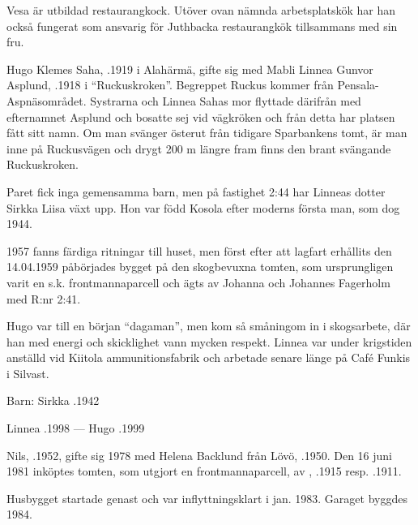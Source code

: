 Vesa är utbildad restaurangkock. Utöver ovan nämnda arbetsplatskök har han också fungerat som ansvarig för Juthbacka restaurangkök tillsammans med sin fru.


%
Hugo Klemes Saha, .1919 i Alahärmä, gifte sig med Mabli Linnea Gunvor Asplund, .1918 i ``Ruckuskroken''. Begreppet Ruckus kommer från Pensala-Aspnäsområdet. Systrarna  och Linnea Sahas mor flyttade därifrån med efternamnet Asplund och bosatte sej vid vägkröken och från detta har platsen fått sitt namn. Om man svänger österut från tidigare Sparbankens tomt, är man inne på Ruckusvägen och drygt 200 m längre fram finns den brant svängande Ruckuskroken.

Paret fick inga gemensamma barn, men på fastighet 2:44 har Linneas dotter Sirkka Liisa växt upp. Hon var född Kosola efter moderns första man, som dog 1944.

1957 fanns färdiga ritningar till huset, men först efter att lagfart erhållits den 14.04.1959 påbörjades bygget på den skogbevuxna tomten, som ursprungligen varit en s.k. frontmannaparcell och ägts av Johanna och Johannes Fagerholm med R:nr 2:41.

Hugo var till en början ``dagaman'', men kom så småningom in i skogsarbete, där han med energi och skicklighet vann mycken respekt. Linnea var under krigstiden anställd vid Kiitola ammunitionsfabrik och arbetade senare länge på Café Funkis i Silvast.

Barn: Sirkka  .1942

Linnea .1998  ---  Hugo .1999



%


%
Nils, .1952, gifte sig 1978 med Helena Backlund från Lövö, .1950. Den 16 juni 1981 inköptes tomten, som utgjort en frontmannaparcell, av , .1915 resp. .1911.

Husbygget startade genast och var inflyttningsklart i  jan. 1983. Garaget byggdes 1984.

